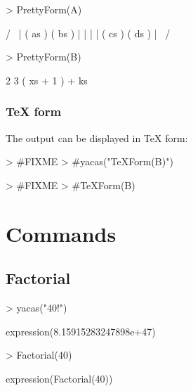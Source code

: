 \documentclass[]{article}
\begin{document}
\begin{Schunk}
\begin{Sinput}
> PrettyForm(A)
\end{Sinput}
\begin{Soutput}
/                \
| ( as ) ( bs )  |
|                |
| ( cs ) ( ds )  |
\                /
\end{Soutput}
\begin{Sinput}
> PrettyForm(B)
\end{Sinput}
\begin{Soutput}
          2     3
( xs + 1 )  + ks 
\end{Soutput}
\end{Schunk}



\subsubsection{TeX form}

The output can be displayed in TeX form:
\begin{Schunk}
\begin{Sinput}
> #FIXME
> #yacas("TeXForm(B)")
\end{Sinput}
\end{Schunk}

\begin{Schunk}
\begin{Sinput}
> #FIXME
> #TeXForm(B)
\end{Sinput}
\end{Schunk}


\section{Commands} 
\label{sec:commands}


\subsection{Factorial}

\begin{Schunk}
\begin{Sinput}
> yacas("40!")
\end{Sinput}
\begin{Soutput}
expression(8.15915283247898e+47)
\end{Soutput}
\end{Schunk}

\begin{Schunk}
\begin{Sinput}
> Factorial(40)
\end{Sinput}
\begin{Soutput}
expression(Factorial(40))
\end{Soutput}
\end{Schunk}
\end{document}
